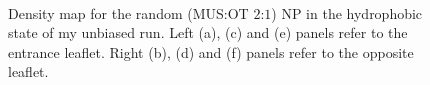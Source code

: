 \begin{figure}[p]
{		}\\%
	\caption{Density map for the random (\acs{MUS}:\acs{OT} $2$:$1$) \acs{NP} in the hydrophobic state of my unbiased run. Left (a), (c) and (e) panels refer to the entrance leaflet. Right (b), (d) and (f) panels refer to the opposite leaflet.}%
	\label{fig:random21Density}
\end{figure}
%
